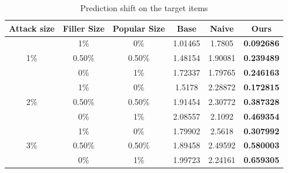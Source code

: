 \documentclass[master,english,final]{kaist-ucs}
\begin{document}

\begin{table}[h]
\caption{Prediction shift on the target items}
\label{resultPredictionShift}
\begin{center}
\begin{tabular}{|c|c|c|c|c|c|}
\hline
\textbf{Attack size} & \textbf{Filler Size} & \textbf{Popular Size} & \textbf{Base} & \textbf{Naive} & \textbf{Ours} \\ \hline
\multirow{3}{*}{1\%} & 1\%                  & 0\%                   & 1.01465       & 1.7805         & \textbf{0.092686} \\ \cline{2-6}
                     & 0.50\%               & 0.50\%                & 1.48154       & 1.90081        & \textbf{0.239489} \\ \cline{2-6}
                     & 0\%                  & 1\%                   & 1.72337       & 1.79765        & \textbf{0.246163} \\ \hline
\multirow{3}{*}{2\%} & 1\%                  & 0\%                   & 1.5178        & 2.28872        & \textbf{0.172815} \\ \cline{2-6}
                     & 0.50\%               & 0.50\%                & 1.91454       & 2.30772        & \textbf{0.387328} \\ \cline{2-6}
                     & 0\%                  & 1\%                   & 2.08557       & 2.1092         & \textbf{0.469354} \\ \hline
\multirow{3}{*}{3\%} & 1\%                  & 0\%                   & 1.79902       & 2.5618         & \textbf{0.307992} \\ \cline{2-6}
                     & 0.50\%               & 0.50\%                & 1.89458       & 2.49592        & \textbf{0.580003} \\ \cline{2-6}
                     & 0\%                  & 1\%                   & 1.99723       & 2.24161        & \textbf{0.659305} \\ \hline
\end{tabular}
\end{center}
\end{table}
\end{document}
